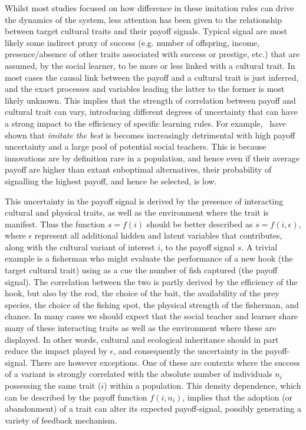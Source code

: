 \documentclass[review,authoryear]{elsarticle}
\begin{document}
Whilst most studies focused on how difference in these imitation rules can drive the dynamics of the system, less attention has been given to the relationship between target cultural traits and their payoff signals. Typical signal are most likely some indirect proxy of success (e.g. number of offspring, income, presence/absence of other traits associated with success or prestige, etc.)  that are assumed, by the social learner, to be more or less linked with a cultural trait. In most cases the causal link between the payoff and a cultural trait is just inferred, and the exact processes and variables leading the latter to the former is most likely unknown. This implies that the strength of correlation between payoff and cultural trait can vary, introducing different degrees of uncertainty that can have a strong impact to the efficiency of specific learning rules. For example,~\citet{crema_lake_inpress} have shown that \emph{imitate the best} is becomes increasingly detrimental with high payoff uncertainty and a large pool of potential social teachers. This is because innovations are by definition rare in a population, and hence even if their average payoff are higher than extant suboptimal alternatives, their probability of signalling the highest payoff, and hence be selected, is low.

This uncertainty in the payoff signal is derived by the presence of interacting cultural and physical traits, as well as the environment where the trait is manifest. Thus the function $s=f(i)$ should be better described as $s=f(i,\epsilon)$, where $\epsilon$ represent all additional hidden and latent variables that contributes, along with the cultural variant of interest $i$, to the payoff signal $s$. A trivial example is a fisherman who might evaluate the performance of a new hook (the target cultural trait) using as a cue the number of fish captured (the payoff signal). The correlation between the two is partly derived by the efficiency of the hook, but also by the rod, the choice of the bait, the availability of the prey species, the choice of the fishing spot, the physical strength of the fisherman, and chance. In many cases we should expect that the social teacher and learner share many of these interacting traits as well as the environment where these are displayed. In other words, cultural and ecological inheritance should in part reduce the impact played by $\epsilon$, and consequently the uncertainty in the payoff-signal. There are however exceptions. One of these are contexts where the success of a variant is strongly correlated with the absolute number of individuals $n_i$ possessing the same trait ($i$) within a population. This density dependence, which can be described by the payoff function $f(i,n_i)$, implies that the adoption (or abandonment) of a trait can alter its expected payoff-signal, possibly generating a variety of feedback mechanism.  
\end{document}
